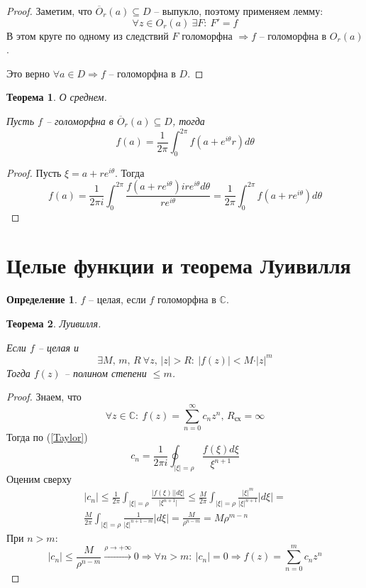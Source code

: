 \documentclass[a4paper,12pt]{article}
\renewcommand{\leq}{\ensuremath{\leqslant}}
\theoremstyle{plain}
\newtheorem{theorem}{Теорема}[section]
\theoremstyle{definition}
\newtheorem{definition}{Определение}[section]
\theoremstyle{remark}
\begin{document}
\begin{proof}
	Заметим, что $\overline{O}_r(a) \subseteq D$ -- выпукло, поэтому применяем лемму:
	\[
		\forall z \in O_r(a) \: \exists F :\: F' = f
	\]
	В этом круге по одному из следствий $F$ голоморфна $\Rightarrow f$ -- голоморфна в $O_r(a)$.

	Это верно $\forall a \in D \Rightarrow f$ -- голоморфна в $D$.
\end{proof}

\begin{theorem}
	О среднем.

	Пусть $f$ -- голоморфна в $\overline{O}_r(a) \subseteq D$, тогда
	\[
		f(a) = \frac{1}{2\pi}\int_0^{2\pi}f(a + e^{i\theta}r)d\theta
	\]
\end{theorem}

\begin{proof}
	Пусть $\xi = a + re^{i\theta}$. Тогда
	\[
		f(a) = \frac{1}{2\pi i}\int_0^{2\pi}\frac{f(a + re^{i\theta})ire^{i\theta}d\theta}{re^{i\theta}} = \frac{1}{2\pi}\int_0^{2\pi}f(a + re^{i\theta})d\theta
	\]
\end{proof}

\section{Целые функции и теорема Луивилля}
\begin{definition}
	$f$ -- целая, если $f$ голоморфна в $\mathbb{C}$.
\end{definition}

\begin{theorem}
	Луивилля.

	Если $f$ -- целая и
	\[
		\exists M,\,m,\,R \: \forall z,\, \vert z\vert > R :\: \vert f(z)\vert < M\cdot\vert z\vert^m
	\]
	Тогда $f(z)$ -- полином степени $\leq m$.
\end{theorem}

\begin{proof}
	Знаем, что
	\[
		\forall z \in \mathbb{C} :\: f(z) = \sum_{n = 0}^\infty c_nz^n,\, R_{\text{сх}} = \infty
	\]
	Тогда по (\ref{Taylor})
	\[
		c_n = \frac{1}{2\pi i}\oint_{\vert \xi\vert = \rho} \frac{f(\xi)d\xi}{\xi^{n + 1}}
	\]
	Оценим сверху
	\begin{align*}
		\vert c_n\vert \leq \frac{1}{2\pi}\int_{\vert \xi\vert = \rho} \frac{\vert f(\xi)\vert\vert d\xi\vert}{\vert\xi^{n + 1}\vert} \leq \frac{M}{2\pi}\int_{\vert \xi\vert = \rho}\frac{\vert \xi\vert^m}{\vert\xi\vert^{n + 1}}\vert d\xi\vert = \\
		\frac{M}{2\pi}\int_{\vert \xi\vert = \rho}\frac{1}{\vert \xi\vert^{n + 1 - m}}\vert d\xi\vert = \frac{M}{\rho^{n - m}} = M\rho^{m - n}
	\end{align*}
	При $n > m$:
	\[
		\vert c_n\vert \leq \frac{M}{\rho^{n - m}} \overset{\rho \to +\infty}{\to} 0 \Rightarrow \forall n > m :\: \vert c_n\vert = 0 \Rightarrow f(z) = \sum_{n = 0}^m c_nz^n
	\]
\end{proof}
\end{document}
